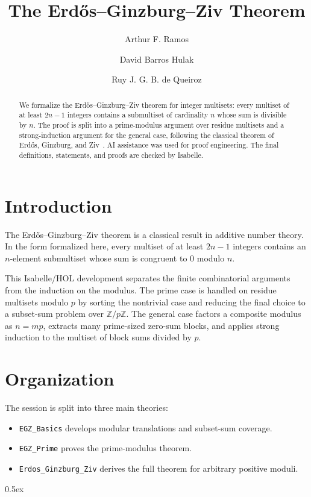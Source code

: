 \documentclass[11pt,a4paper]{article}
\begin{document}
\title{The Erd\H{o}s--Ginzburg--Ziv Theorem}
\author{Arthur F. Ramos \and David Barros Hulak \and Ruy J. G. B. de Queiroz}
\maketitle

\begin{abstract}
  We formalize the Erd\H{o}s--Ginzburg--Ziv theorem for integer multisets: every
  multiset of at least $2n-1$ integers contains a submultiset of cardinality
  $n$ whose sum is divisible by $n$. The proof is split into a prime-modulus
  argument over residue multisets and a strong-induction argument for the
  general case, following the classical theorem of Erd\H{o}s, Ginzburg, and
  Ziv~\cite{ErdosGinzburgZiv1961}. AI assistance was used for proof
  engineering. The final definitions, statements, and proofs are checked by
  Isabelle.
\end{abstract}

\section{Introduction}

The Erd\H{o}s--Ginzburg--Ziv theorem is a classical result in additive number
theory. In the form formalized here, every multiset of at least $2n-1$
integers contains an $n$-element submultiset whose sum is congruent to $0$
modulo $n$.

This Isabelle/HOL development separates the finite combinatorial arguments from
the induction on the modulus. The prime case is handled on residue multisets
modulo $p$ by sorting the nontrivial case and reducing the final choice to a
subset-sum problem over $\mathbb{Z}/p\mathbb{Z}$. The general case factors a
composite modulus as $n = mp$, extracts many prime-sized zero-sum blocks, and
applies strong induction to the multiset of block sums divided by $p$.

\section{Organization}

The session is split into three main theories:
\begin{itemize}
\item \texttt{EGZ\_Basics} develops modular translations and subset-sum coverage.
\item \texttt{EGZ\_Prime} proves the prime-modulus theorem.
\item \texttt{Erdos\_Ginzburg\_Ziv} derives the full theorem for arbitrary
positive moduli.
\end{itemize}

\tableofcontents

\parindent 0pt\parskip 0.5ex





\end{document}
